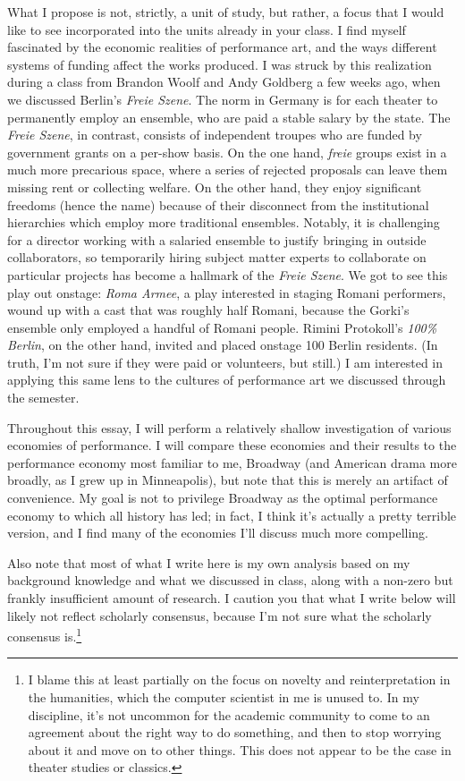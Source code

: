 What I propose is not, strictly, a unit of study, but rather, a focus that I would like to
see incorporated into the units already in your class. I find myself fascinated by the
economic realities of performance art, and the ways different systems of funding affect
the works produced. I was struck by this realization during a class from Brandon Woolf and
Andy Goldberg a few weeks ago, when we discussed Berlin's \textit{Freie Szene}. The norm
in Germany is for each theater to permanently employ an ensemble, who are paid a stable
salary by the state. The \textit{Freie Szene}, in contrast, consists of independent
troupes who are funded by government grants on a per-show basis. On the one hand,
\textit{freie} groups exist in a much more precarious space, where a series of rejected
proposals can leave them missing rent or collecting welfare. On the other hand, they enjoy
significant freedoms (hence the name) because of their disconnect from the institutional
hierarchies which employ more traditional ensembles. Notably, it is challenging for a
director working with a salaried ensemble to justify bringing in outside collaborators, so
temporarily hiring subject matter experts to collaborate on particular projects has become
a hallmark of the \textit{Freie Szene}. We got to see this play out onstage: \textit{Roma
  Armee}, a play interested in staging Romani performers, wound up with a cast that was
roughly half Romani, because the Gorki's ensemble only employed a handful of Romani
people. Rimini Protokoll's \textit{100\% Berlin}, on the other hand, invited and placed
onstage 100 Berlin residents. (In truth, I'm not sure if they were paid or volunteers, but
still.) I am interested in applying this same lens to the cultures of performance art we
discussed through the semester.

Throughout this essay, I will perform a relatively shallow investigation of various
economies of performance. I will compare these economies and their results to the
performance economy most familiar to me, Broadway (and American drama more broadly, as I
grew up in Minneapolis), but note that this is merely an artifact of convenience. My goal
is not to privilege Broadway as the optimal performance economy to which all history has
led; in fact, I think it's actually a pretty terrible version, and I find many of the
economies I'll discuss much more compelling.

Also note that most of what I write here is my own analysis based on my background
knowledge and what we discussed in class, along with a non-zero but frankly insufficient
amount of research. I caution you that what I write below will likely not reflect
scholarly consensus, because I'm not sure what the scholarly consensus is.\footnote{I
  blame this at least partially on the focus on novelty and reinterpretation in the
  humanities, which the computer scientist in me is unused to. In my discipline, it's not
  uncommon for the academic community to come to an agreement about the right way to do
  something, and then to stop worrying about it and move on to other things. This does not
  appear to be the case in theater studies or classics.}

